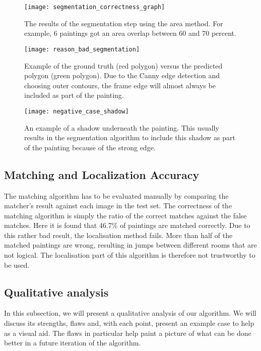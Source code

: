 \begin{figure}
	\centering
	\texttt{[image: segmentation\_correctness\_graph]}
	\caption{The results of the segmentation step using the area method. For example, 6 paintings got an area overlap between 60 and 70 percent.} 
	\label{fig:segmentation_correctness_graph}
\end{figure}
\begin{figure}
	\centering
	\texttt{[image: reason\_bad\_segmentation]}
	\caption{Example of the ground truth (red polygon) versus the predicted polygon (green polygon). Due to the Canny edge detection and choosing outer contours, the frame edge will almost always be included as part of the painting.}
	\label{fig:reason_bad_segmentation}
\end{figure}



\begin{figure}
	\centering
	\texttt{[image: negative\_case\_shadow]}
	\caption{An example of a shadow underneath the painting. This usually results in the segmentation algorithm to include this shadow as part of the painting because of the strong edge.}
	\label{fig:negative_case_shadow}
\end{figure}


\subsection{Matching and Localization Accuracy}
The matching algorithm has to be evaluated manually by comparing the matcher's result against each image in the test set. The correctness of the matching algorithm is simply the ratio of the correct matches against the false matches. Here it is found that 46.7\% of paintings are matched correctly. Due to this rather bad result, the localisation method fails. More than half of the matched paintings are wrong, resulting in jumps between different rooms that are not logical. The localisation part of this algorithm is therefore not trustworthy  to be used.




\subsection{Qualitative analysis}
In this subsection, we will present a qualitative analysis of our algorithm. We will discuss its strengths, flaws and, with each point, present an example case to help as a visual aid. The flaws in particular help paint a picture of what can be done better in a future iteration of the algorithm. 


